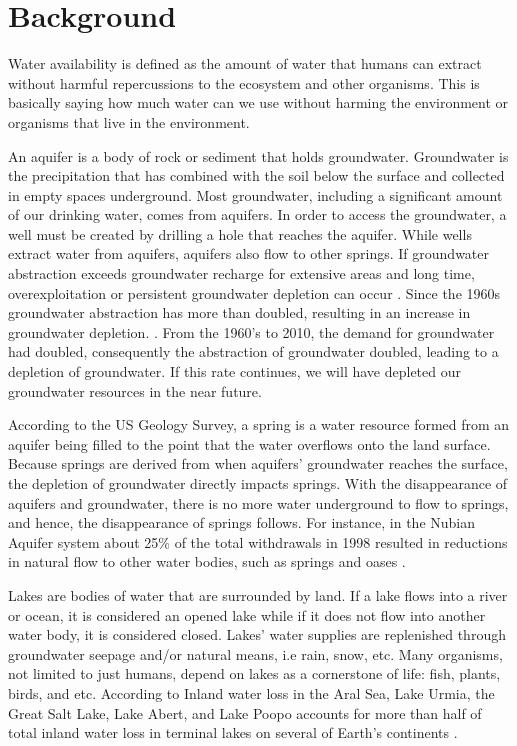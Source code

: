 \documentclass[12pt, letterpaper]{article}
\begin{document}
\section{Background}
Water availability is defined as the amount of water that humans can extract without harmful repercussions to the ecosystem and other organisms. This is basically saying how much water can we use without harming the environment or organisms that live in the environment.

An aquifer is a body of rock or sediment that holds groundwater. Groundwater is the precipitation that has combined with the soil below the surface and collected in empty spaces underground. Most groundwater, including a significant amount of our drinking water, comes from aquifers. In order to access the groundwater, a well must be created by drilling a hole that reaches the aquifer. While wells extract water from aquifers, aquifers also flow to other springs. If groundwater abstraction exceeds groundwater recharge for extensive areas and long time, overexploitation or persistent groundwater depletion can occur \cite{gleeson2010commentary}. Since the 1960s groundwater abstraction has more than doubled, resulting in an increase in groundwater depletion. \cite{wada2010global}. From the 1960’s to 2010, the demand for groundwater had doubled, consequently the abstraction of groundwater doubled, leading to a depletion of groundwater. If this rate continues, we will have depleted our groundwater resources in the near future. 

According to the US Geology Survey, a spring is a water resource formed from an aquifer being filled to the point that the water overflows onto the land surface. Because springs are derived from when aquifers’ groundwater reaches the surface, the depletion of groundwater directly impacts springs. With the disappearance of aquifers and groundwater, there is no more water underground to flow to springs, and hence, the disappearance of springs follows. For instance, in the Nubian Aquifer system about 25\% of the total withdrawals in 1998 resulted in reductions in natural flow to other water bodies, such as springs and oases \cite{cedare2001}. 

Lakes are bodies of water that are surrounded by land. If a lake flows into a river or ocean, it is considered an opened lake while if it does not flow into another water body, it is considered closed. Lakes’ water supplies are replenished through groundwater seepage and/or natural means, i.e rain, snow, etc. Many organisms, not limited to just humans, depend on lakes as a cornerstone of life: fish, plants, birds, and etc.  According to Inland water loss in the Aral Sea, Lake Urmia, the Great Salt Lake, Lake Abert, and Lake Poopo accounts for more than half of total inland water loss in terminal lakes on several of Earth's continents \cite{wine2020water}.
\end{document}
